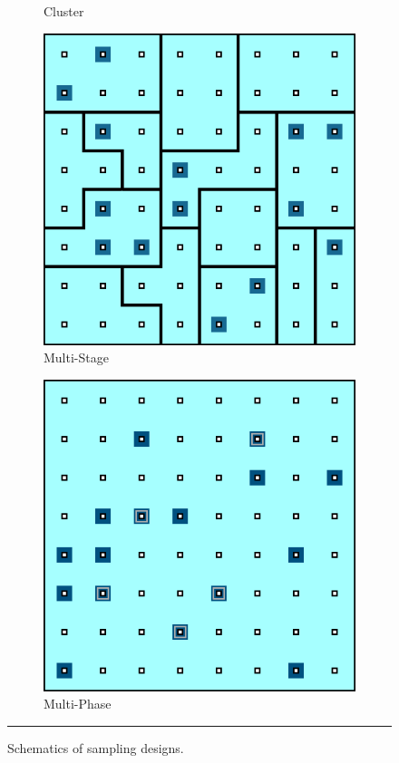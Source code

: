 \begin{figure}[t]
\begin{subfigure}[b]{0.30\textwidth}
\caption{\small Cluster} 
\label{fig:ClS}
\end{subfigure}\quad
\begin{subfigure}[b]{0.30\textwidth}
\includegraphics[width=\textwidth]{images/DC/Sampling_MSS.png}
\caption{\small Multi-Stage} 
\label{fig:MPS}
\end{subfigure}\quad
\begin{subfigure}[b]{0.30\textwidth}
\includegraphics[width=\textwidth]{images/DC/Sampling_MPS.png}
\caption{\small Multi-Phase} 
\label{fig:MSS}
\end{subfigure}
\caption[\small Schematics of sampling designs]{\small Schematics of sampling designs.}
\hrule\label{fig:designs}
\end{figure}
